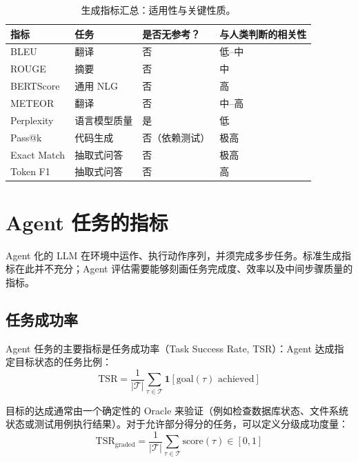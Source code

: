 \begin{table}[ht!]
\centering\small
\caption{生成指标汇总：适用性与关键性质。}
\begin{tabular}{@{}l l l l@{}}
\toprule
\textbf{指标} & \textbf{任务} & \textbf{是否无参考？} & \textbf{与人类判断的相关性} \\
\midrule
BLEU & 翻译 & 否 & 低--中 \\
ROUGE & 摘要 & 否 & 中 \\
BERTScore & 通用 NLG & 否 & 高 \\
METEOR & 翻译 & 否 & 中--高 \\
Perplexity & 语言模型质量 & 是 & 低 \\
Pass@k & 代码生成 & 否（依赖测试） & 极高 \\
Exact Match & 抽取式问答 & 否 & 极高 \\
Token F1 & 抽取式问答 & 否 & 高 \\
\bottomrule
\end{tabular}
\end{table}

\section{Agent 任务的指标}
\label{subsec:agentic-metrics}

Agent 化的 LLM 在环境中运作、执行动作序列，并须完成多步任务。标准生成指标在此并不充分；Agent 评估需要能够刻画任务完成度、效率以及中间步骤质量的指标。

\subsection{任务成功率}
\label{task-success-rate}

Agent 任务的主要指标是任务成功率（Task Success Rate, TSR）：Agent 达成指定目标状态的任务比例：
\begin{equation}
    \text{TSR} = \frac{1}{|\mathcal{T}|} \sum_{\tau \in \mathcal{T}} \mathbf{1}[\text{goal}(\tau) \text{ achieved}]
\end{equation}

目标的达成通常由一个确定性的 Oracle 来验证（例如检查数据库状态、文件系统状态或测试用例执行结果）。对于允许部分得分的任务，可以定义分级成功度量：
\begin{equation}
    \text{TSR}_{\text{graded}} = \frac{1}{|\mathcal{T}|} \sum_{\tau \in \mathcal{T}} \text{score}(\tau) \in [0, 1]
\end{equation}

